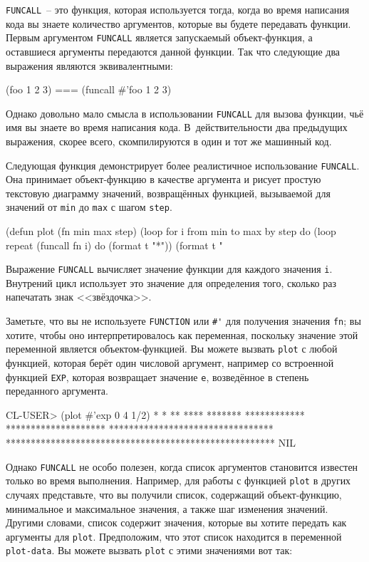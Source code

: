 \lstinline{FUNCALL}~-- это функция, которая используется тогда, когда во время написания кода вы
знаете количество аргументов, которые вы будете передавать функции.  Первым аргументом
\lstinline{FUNCALL} является запускаемый объект-функция, а оставшиеся аргументы передаются
данной функции.  Так что следующие два выражения являются эквивалентными:

\begin{myverb}
(foo 1 2 3) === (funcall #'foo 1 2 3)
\end{myverb}

Однако довольно мало смысла в использовании \lstinline{FUNCALL} для вызова функции, чьё имя вы
знаете во время написания кода.  В~действительности два предыдущих выражения, скорее всего,
скомпилируются в один и тот же машинный код.

Следующая функция демонстрирует более реалистичное использование \lstinline{FUNCALL}.  Она
принимает объект-функцию в качестве аргумента и рисует простую текстовую диаграмму
значений, возвращённых функцией, вызываемой для значений от \lstinline{min} до \lstinline{max} с
шагом \lstinline{step}.

\begin{myverb}
(defun plot (fn min max step)
  (loop for i from min to max by step do
        (loop repeat (funcall fn i) do (format t "*"))
        (format t "~%
\end{myverb}

Выражение \lstinline{FUNCALL} вычисляет значение функции для каждого значения \lstinline{i}.
Внутрений цикл использует это значение для определения того, сколько раз напечатать знак
<<звёздочка>>.

Заметьте, что вы не используете \lstinline{FUNCTION} или \lstinline!#'! для получения значения
\lstinline{fn}; вы хотите, чтобы оно интерпретировалось как переменная, поскольку значение этой
переменной является объектом-функцией.  Вы можете вызвать \lstinline{plot} с любой функцией,
которая берёт один числовой аргумент, например со встроенной функцией \lstinline{EXP}, которая
возвращает значение \lstinline{e}, возведённое в степень переданного аргумента.

\begin{myverb}
CL-USER> (plot #'exp 0 4 1/2)
*
*
**
****
*******
************
********************
*********************************
******************************************************
NIL
\end{myverb}

Однако \lstinline{FUNCALL} не особо полезен, когда список аргументов становится известен только
во время выполнения.  Например, для работы с функцией \lstinline{plot} в других случаях
представьте, что вы получили список, содержащий объект-функцию, минимальное и максимальное
значения, а также шаг изменения значений.  Другими словами, список содержит значения,
которые вы хотите передать как аргументы для \lstinline{plot}.  Предположим, что этот список
находится в переменной \lstinline{plot-data}.  Вы можете вызвать \lstinline{plot} с этими значениями
вот так:

